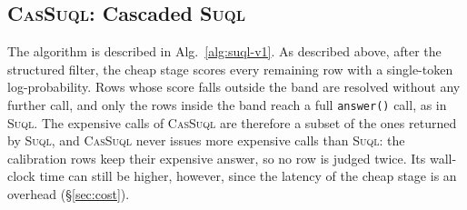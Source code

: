 \documentclass[sigconf]{acmart}
\begin{document}

\subsection{\textsc{CasSuql}: Cascaded \textsc{Suql}}
\label{sec:suql-v1}
The algorithm is described in Alg.~\ref{alg:suql-v1}. As described above, after the structured filter, the cheap stage scores every remaining row with a single-token log-probability. Rows whose score falls outside the band are resolved without any further call, and only the rows inside the band reach a full \texttt{answer()} call, as in \textsc{Suql}. The expensive calls of \textsc{CasSuql} are therefore a subset of the ones returned by \textsc{Suql}, and \textsc{CasSuql} never issues more expensive calls than \textsc{Suql}: the calibration rows keep their expensive answer, so no row is judged twice. Its wall-clock time can still be higher, however, since the latency of the cheap stage is an overhead (\S\ref{sec:cost}).
\end{document}
